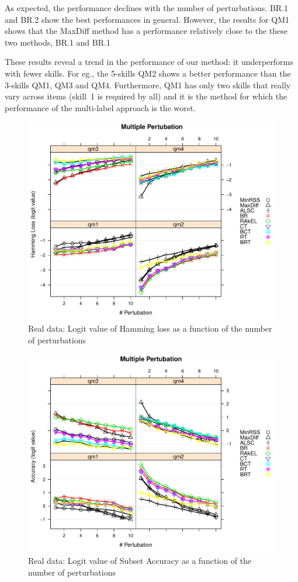 \documentclass[runningheads,a4paper]{llncs}
\begin{document}
As expected, the performance declines with the number of perturbations. BR.1 and BR.2 show the best performances in general.  However, the results for QM1 shows that the MaxDiff method has a performance relatively close to the these two methods, BR.1 and BR.1

These results reveal a trend in the performance of our method: it underperforms with fewer skills. For eg., the 5-skills QM2 shows a better performance than the 3-skills QM1, QM3 and QM4. Furthermore, QM1 has only two skills that really vary across items (skill~1 is required by all) and it is the method for which the performance of the multi-label approach is the worst.

\begin{figure}
  \centering
    \includegraphics[width=100 mm ,scale=0.25]{graph/HL.pdf}
  \caption{Real data: Logit value of Hamming loss as a function of the number of perturbations}\label{fig:HLforReal}
\end{figure}

\begin{figure}
  \centering
    \includegraphics[width=100 mm ,scale=0.25]{graph/SA.pdf}
  \caption{Real data: Logit value of Subset Accuracy as a function of the number of perturbations}\label{fig:SAforReal}
\end{figure}
\end{document}
